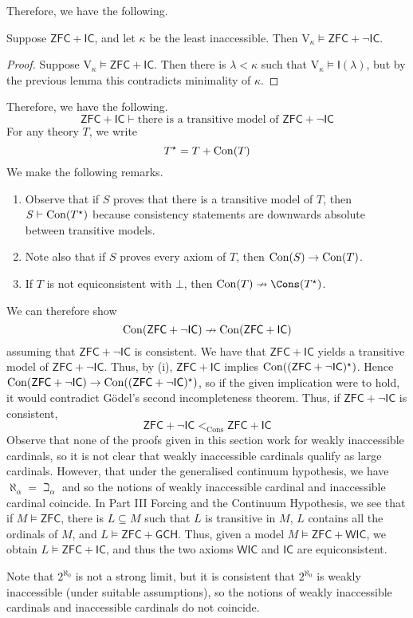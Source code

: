 Therefore, we have the following.
\begin{theorem}
    Suppose \( \mathsf{ZFC} + \mathsf{IC} \), and let \( \kappa \) be the least inaccessible.
    Then \( \mathrm{V}_\kappa \vDash \mathsf{ZFC} + \neg\mathsf{IC} \).
\end{theorem}
\begin{proof}
    Suppose \( \mathrm{V}_\kappa \vDash \mathsf{ZFC} + \mathsf{IC} \).
    Then there is \( \lambda < \kappa \) such that \( \mathrm{V}_\kappa \vDash \mathsf{I}(\lambda) \), but by the previous lemma this contradicts minimality of \( \kappa \).
\end{proof}
Therefore, we have the following.
\[ \mathsf{ZFC} + \mathsf{IC} \vdash \text{there is a transitive model of } \mathsf{ZFC} + \neg\mathsf{IC} \]
For any theory \( T \), we write
\[ T^\star = T + \operatorname{Con}(T) \]
We make the following remarks.
\begin{enumerate}
    \item Observe that if \( S \) proves that there is a transitive model of \( T \), then \( S \vdash \operatorname{Con}(T^\star) \) because consistency statements are downwards absolute between transitive models.
    \item Note also that if \( S \) proves every axiom of \( T \), then \( \operatorname{Con}(S) \to \operatorname{Con}(T) \).
    \item If \( T \) is not equiconsistent with \( \bot \), then \( \Con(T) \nrightarrow \Cons(T^\star) \).
\end{enumerate}
We can therefore show
\[ \operatorname{Con}(\mathsf{ZFC} + \neg\mathsf{IC}) \nrightarrow \operatorname{Con}(\mathsf{ZFC} + \mathsf{IC}) \]
assuming that \( \mathsf{ZFC} + \neg\mathsf{IC} \) is consistent.
We have that \( \mathsf{ZFC} + \mathsf{IC} \) yields a transitive model of \( \mathsf{ZFC} + \neg\mathsf{IC} \).
Thus, by (i), \( \mathsf{ZFC} + \mathsf{IC} \) implies \( \operatorname{Con}((\mathsf{ZFC} + \neg\mathsf{IC})^\star) \).
Hence \( \operatorname{Con}(\mathsf{ZFC} + \neg\mathsf{IC}) \to \operatorname{Con}((\mathsf{ZFC} + \neg\mathsf{IC})^\star) \), so if the given implication were to hold, it would contradict G\"odel's second incompleteness theorem.
Thus, if \( \mathsf{ZFC} + \neg\mathsf{IC} \) is consistent,
\[ \mathsf{ZFC} + \neg\mathsf{IC} <_{\mathrm{Cons}} \mathsf{ZFC} + \mathsf{IC} \]
Observe that none of the proofs given in this section work for weakly inaccessible cardinals, so it is not clear that weakly inaccessible cardinals qualify as large cardinals.
However, that under the generalised continuum hypothesis, we have \( \aleph_\alpha = \beth_\alpha \) and so the notions of weakly inaccessible cardinal and inaccessible cardinal coincide.
In Part III Forcing and the Continuum Hypothesis, we see that if \( M \vDash \mathsf{ZFC} \), there is \( L \subseteq M \) such that \( L \) is transitive in \( M \), \( L \) contains all the ordinals of \( M \), and \( L \vDash \mathsf{ZFC} + \mathsf{GCH} \).
Thus, given a model \( M \vDash \mathsf{ZFC} + \mathsf{WIC} \), we obtain \( L \vDash \mathsf{ZFC} + \mathsf{IC} \), and thus the two axioms \( \mathsf{WIC} \) and \( \mathsf{IC} \) are equiconsistent.

Note that \( 2^{\aleph_0} \) is not a strong limit, but it is consistent that \( 2^{\aleph_0} \) is weakly inaccessible (under suitable assumptions), so the notions of weakly inaccessible cardinals and inaccessible cardinals do not coincide.
